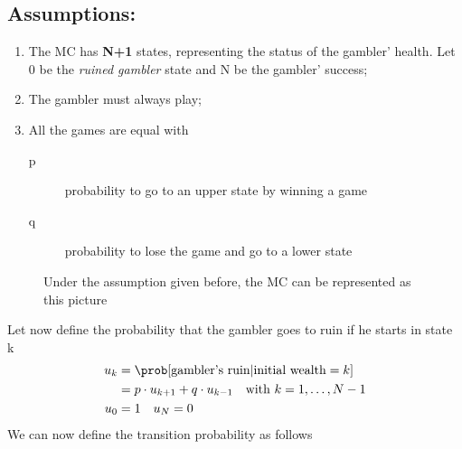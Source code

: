 \subsection{Assumptions:}
\begin{enumerate}
	\item The MC has \textbf{N+1} states, representing the status of the gambler' health.
	 Let 0 be the \textit{ruined gambler} state and N be the gambler' success;
	\item The gambler must always play;
	\item All the games are equal with
	\begin{description}
		\item[p] probability to go to an upper state by winning a game
		\item[q] probability to lose the game and go to a lower state
	\end{description}
\end{enumerate}
\begin{figure}[h]
	
	\caption{Under the assumption given before, the MC can be represented as this picture}
	\label{}
\end{figure}

Let now define the probability that the gambler goes to ruin if he starts in state k
\begin{equation}\begin{split}
	u_k &= \prob[\text{gambler's ruin}|\text{initial wealth}=k] \\
	&=p \cdot u_{k+1} + q \cdot u_{k-1} \quad \text{with }k=1, \dots, N-1 \\
	u_0 &= 1 \quad u_N = 0
\end{split}\label{eq:defUk}
\end{equation}
We can now define the transition probability as follows

